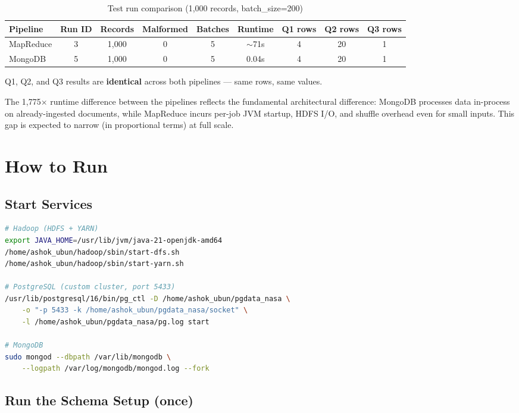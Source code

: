 \documentclass[12pt,a4paper]{article}
\begin{document}
\begin{table}[h!]
\centering
\begin{tabularx}{\textwidth}{lcccccccc}
\toprule
Pipeline   & Run ID & Records & Malformed & Batches & Runtime & Q1 rows & Q2 rows & Q3 rows \\
\midrule
MapReduce  & 3 & 1,000 & 0 & 5 & $\sim$71s & 4 & 20 & 1 \\
MongoDB    & 5 & 1,000 & 0 & 5 & 0.04s    & 4 & 20 & 1 \\
\bottomrule
\end{tabularx}
\caption{Test run comparison (1,000 records, batch\_size=200)}
\end{table}

Q1, Q2, and Q3 results are \textbf{identical} across both pipelines --- same rows, same values.

The 1,775$\times$ runtime difference between the pipelines reflects the fundamental architectural
difference: MongoDB processes data in-process on already-ingested documents, while MapReduce
incurs per-job JVM startup, HDFS I/O, and shuffle overhead even for small inputs. This gap
is expected to narrow (in proportional terms) at full scale.

\section{How to Run}

\subsection{Start Services}

\begin{lstlisting}[language=bash]
# Hadoop (HDFS + YARN)
export JAVA_HOME=/usr/lib/jvm/java-21-openjdk-amd64
/home/ashok_ubun/hadoop/sbin/start-dfs.sh
/home/ashok_ubun/hadoop/sbin/start-yarn.sh

# PostgreSQL (custom cluster, port 5433)
/usr/lib/postgresql/16/bin/pg_ctl -D /home/ashok_ubun/pgdata_nasa \
    -o "-p 5433 -k /home/ashok_ubun/pgdata_nasa/socket" \
    -l /home/ashok_ubun/pgdata_nasa/pg.log start

# MongoDB
sudo mongod --dbpath /var/lib/mongodb \
    --logpath /var/log/mongodb/mongod.log --fork
\end{lstlisting}

\subsection{Run the Schema Setup (once)}
\end{document}
